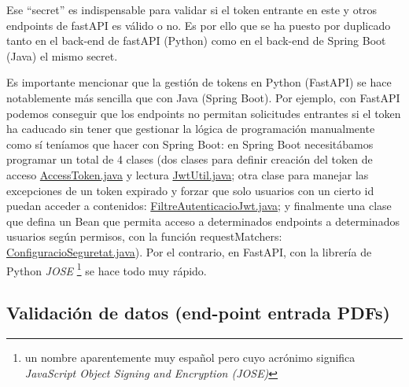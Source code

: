 \documentclass[a4paper,12pt]{report}
\begin{document}
	Ese ``secret'' es indispensable para validar si el token entrante en este y otros endpoints de fastAPI es válido o no. Es por ello que se ha puesto por duplicado tanto en el back-end de fastAPI (Python) como en el back-end de Spring Boot (Java) el mismo secret.
	
	Es importante mencionar que la gestión de tokens en Python (FastAPI) se hace notablemente más sencilla que con Java (Spring Boot). Por ejemplo, con FastAPI podemos conseguir que los endpoints no permitan solicitudes entrantes si el token ha caducado sin tener que gestionar la lógica de programación manualmente como sí teníamos que hacer con Spring Boot: en Spring Boot necesitábamos programar un total de 4 clases (dos clases para definir creación del token de acceso \href{https://github.com/blackcub3s/mercApp/blob/main/APP%20WEB/__springboot__produccio__/app/src/main/java/miApp/app/seguretat/jwt/AccessToken.java}{AccessToken.java} y lectura \href{https://github.com/blackcub3s/mercApp/blob/main/APP%20WEB/__springboot__produccio__/app/src/main/java/miApp/app/seguretat/jwt/JwtUtil.java}{JwtUtil.java}; otra clase para manejar las excepciones de un token expirado y forzar que solo usuarios con un cierto id puedan acceder a contenidos: \href{https://github.com/blackcub3s/mercApp/blob/main/APP%20WEB/__springboot__produccio__/app/src/main/java/miApp/app/seguretat/FiltreAutenticacioJwt.java}{FiltreAutenticacioJwt.java}; y finalmente una clase que defina un Bean que permita acceso a determinados endpoints a determinados usuarios según permisos, con la función requestMatchers: \href{https://github.com/blackcub3s/mercApp/blob/main/APP%20WEB/__springboot__produccio__/app/src/main/java/miApp/app/seguretat/ConfiguracioSeguretat.java}{ConfiguracioSeguretat.java}). Por el contrario, en FastAPI, con la librería de Python \textit{JOSE} \cite{pythonJose}\footnote{un nombre aparentemente muy español pero cuyo acrónimo significa \textit{JavaScript Object Signing and Encryption (JOSE)}} se hace todo muy rápido.
	
	\subsection{Validación de datos (end-point entrada PDFs)}
\end{document}
